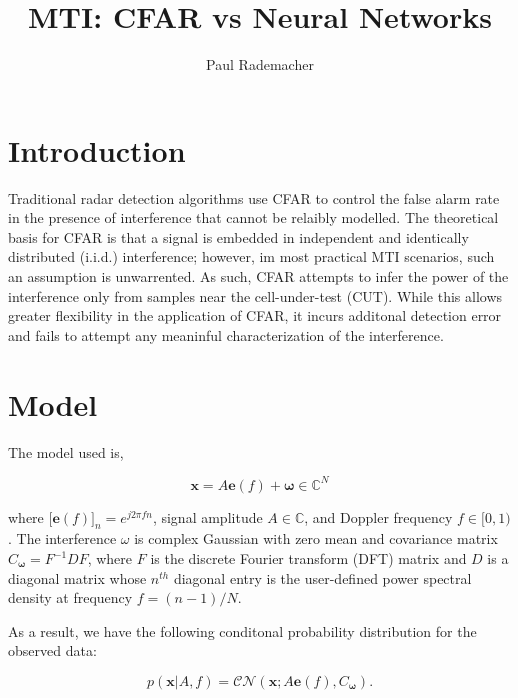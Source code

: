 \documentclass[11pt]{article}
\title{MTI: CFAR vs Neural Networks}
\author{Paul Rademacher}
\begin{document}
\maketitle




\section{Introduction}

Traditional radar detection algorithms use CFAR to control the false alarm rate in the presence of interference that cannot be relaibly modelled. The theoretical basis for CFAR is that a signal is embedded in independent and identically distributed (i.i.d.) interference; however, im most practical MTI scenarios, such an assumption is unwarrented. As such, CFAR attempts to infer the power of the interference only from samples near the cell-under-test (CUT). While this allows greater flexibility in the application of CFAR, it incurs additonal detection error and fails to attempt any meaninful characterization of the interference.




\section{Model}

The model used is,

\begin{equation}
\bm{x}=A\bm{e}(f)+\bm{\omega} \in \mathbb{C}^N
\end{equation}

where [$\bm{e}(f)]_n = e^{j2\pi fn}$, signal amplitude $A\in \mathbb{C}$, and Doppler frequency $f \in [0,1)$. The interference $\omega$ is complex Gaussian with zero mean and covariance matrix $C_{\bm{\omega}} = F^{-1}DF$, where $F$ is the discrete Fourier transform (DFT) matrix and $D$ is a diagonal matrix whose $n^{th}$ diagonal entry is the user-defined power spectral density at frequency $f=(n-1)/N$.

As a result, we have the following conditonal probability distribution for the observed data:

\begin{equation}
p(\bm{x}|A,f) = \mathcal{CN}(\bm{x};A\bm{e}(f),C_{\bm{\omega}}).
\end{equation}
\end{document}
